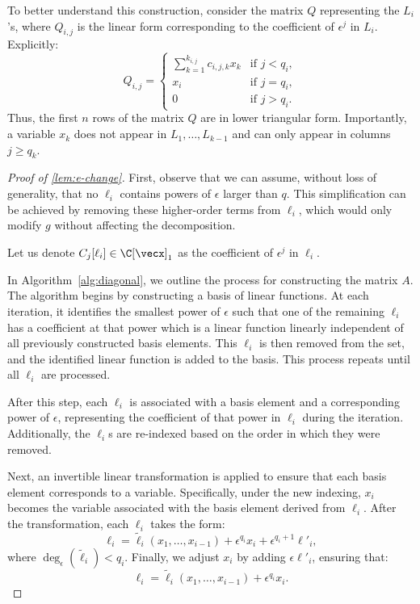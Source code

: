 \documentclass{article}
\begin{document}
To better understand this construction, consider the matrix $Q$ representing the $L_i$'s, where $Q_{i,j}$ is the linear form corresponding to the coefficient of $\epsilon^j$ in $L_i$. Explicitly:
\[
Q_{i,j} = 
\begin{cases} 
    \sum_{k=1}^{k_{i,j}} c_{i,j,k} x_k & \text{if } j < q_i, \\[5pt]
    x_i & \text{if } j = q_i, \\[5pt]
    0 & \text{if } j > q_i.
\end{cases}
\]
Thus, the first $n$ rows of the matrix $Q$ are in lower triangular form. Importantly, a variable $x_k$ does not appear in $L_1, \ldots, L_{k-1}$ and can only appear in columns $j \geq q_k$.


\begin{proof}[Proof of \autoref{lem:e-change}]
    First, observe that we can assume, without loss of generality, that no $\ell_i$ contains powers of $\epsilon$ larger than $q$. This simplification can be achieved by removing these higher-order terms from $\ell_i$, which would only modify $g$ without affecting the decomposition.

    Let us denote $C_j[\ell_i] \in \C[\vecx]_1$ as the coefficient of $\epsilon^j$ in $\ell_i$.

    In Algorithm~\ref{alg:diagonal}, we outline the process for constructing the matrix $A$. The algorithm begins by constructing a basis of linear functions. At each iteration, it identifies the smallest power of $\epsilon$ such that one of the remaining $\ell_i$ has a coefficient at that power which is a linear function linearly independent of all previously constructed basis elements. This $\ell_i$ is then removed from the set, and the identified linear function is added to the basis. This process repeats until all $\ell_i$ are processed.

    After this step, each $\ell_i$ is associated with a basis element and a corresponding power of $\epsilon$, representing the coefficient of that power in $\ell_i$ during the iteration. Additionally, the $\ell_i$s are re-indexed based on the order in which they were removed.

    Next, an invertible linear transformation is applied to ensure that each basis element corresponds to a variable. Specifically, under the new indexing, $x_i$ becomes the variable associated with the basis element derived from $\ell_i$. After the transformation, each $\ell_i$ takes the form:
    \[
    \ell_i = \tilde{\ell}_i(x_1, \ldots, x_{i-1}) + \epsilon^{q_i}x_i + \epsilon^{q_i+1}\ell'_i,
    \]
    where $\deg_{\epsilon}(\tilde{\ell}_i) < q_i$. Finally, we adjust $x_i$ by adding $\epsilon\ell'_i$, ensuring that:
    \[
    \ell_i = \tilde{\ell}_i(x_1, \ldots, x_{i-1}) + \epsilon^{q_i}x_i.
    \]


\end{proof}
\end{document}
